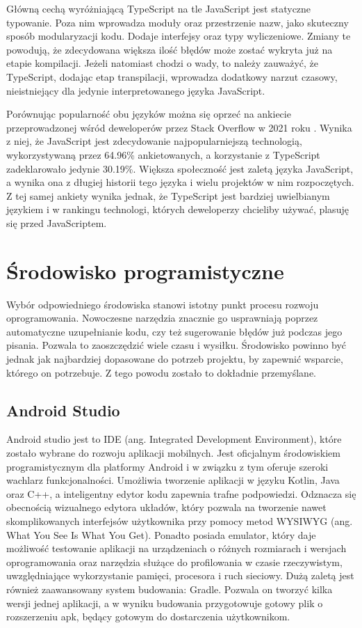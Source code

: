 Główną cechą wyróżniającą TypeScript na tle JavaScript jest statyczne typowanie. Poza nim wprowadza moduły oraz przestrzenie nazw, jako skuteczny sposób modularyzacji kodu. Dodaje interfejsy oraz typy wyliczeniowe. Zmiany te powodują, że zdecydowana większa ilość błędów może zostać wykryta już na etapie kompilacji. Jeżeli natomiast chodzi o wady, to należy zauważyć, że TypeScript, dodając etap transpilacji, wprowadza dodatkowy narzut czasowy, nieistniejący dla jedynie interpretowanego języka JavaScript.

Porównując popularność obu języków można się oprzeć na ankiecie przeprowadzonej wśród deweloperów przez Stack Overflow w 2021 roku \cite{stackoverflow-ankieta}. Wynika z niej, że JavaScript jest zdecydowanie najpopularniejszą technologią, wykorzystywaną przez 64.96\% ankietowanych, a korzystanie z TypeScript zadeklarowało jedynie 30.19\%. Większa społeczność jest zaletą języka JavaScript, a wynika ona z długiej historii tego języka i wielu projektów w nim rozpoczętych. Z tej samej ankiety wynika jednak, że TypeScript jest bardziej uwielbianym językiem i w rankingu technologi, których deweloperzy chcieliby używać, plasuję się przed JavaScriptem.

\section{Środowisko programistyczne}
Wybór odpowiedniego środowiska stanowi istotny punkt procesu rozwoju oprogramowania. Nowoczesne narzędzia znacznie go usprawniają poprzez automatyczne uzupełnianie kodu, czy też sugerowanie błędów już podczas jego pisania. Pozwala to zaoszczędzić wiele czasu i wysiłku. Środowisko powinno być jednak jak najbardziej dopasowane do potrzeb projektu, by zapewnić wsparcie, którego on potrzebuje. Z tego powodu zostało to dokładnie przemyślane.

\subsection{Android Studio}
Android studio jest to IDE (ang. Integrated Development Environment), które zostało wybrane do rozwoju aplikacji mobilnych. Jest oficjalnym środowiskiem programistycznym dla platformy Android i w związku z tym oferuje szeroki wachlarz funkcjonalności. Umożliwia tworzenie aplikacji w języku Kotlin, Java oraz C++, a inteligentny edytor kodu zapewnia trafne podpowiedzi. Odznacza się obecnością wizualnego edytora układów, który pozwala na tworzenie nawet skomplikowanych interfejsów użytkownika przy pomocy metod \mbox{WYSIWYG} (ang. What You See Is What You Get). Ponadto posiada emulator, który daje możliwość testowanie aplikacji na urządzeniach o różnych rozmiarach i wersjach oprogramowania oraz narzędzia służące do profilowania w czasie rzeczywistym, uwzględniające wykorzystanie pamięci, procesora i ruch sieciowy. Dużą zaletą jest również zaawansowany system budowania: Gradle. Pozwala on tworzyć kilka wersji jednej aplikacji, a w wyniku budowania przygotowuje gotowy plik o rozszerzeniu apk, będący gotowym do dostarczenia użytkownikom.

